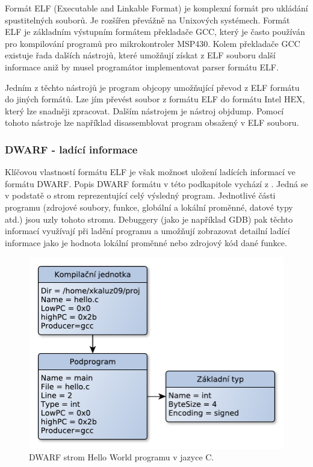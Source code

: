Formát ELF (Executable and Linkable Format) je komplexní formát pro ukládání spustitelných souborů. Je rozšířen převážně na Unixových systémech. Formát ELF je základním výstupním formátem překladače GCC, který je často používán pro kompilování programů pro mikrokontroler MSP430. Kolem překladače GCC existuje řada dalších nástrojů, které umožňují získat z ELF souboru další informace aniž by musel programátor implementovat parser formátu ELF. \cite{elf}

Jedním z těchto nástrojů je program objcopy umožňující převod z ELF formátu do jiných formátů. Lze jím převést soubor z formátu ELF do formátu Intel HEX, který lze snadněji zpracovat. Dalším nástrojem je nástroj objdump. Pomocí tohoto nástroje lze například disassemblovat program obsažený v ELF souboru.

\subsubsection{DWARF - ladící informace}

Klíčovou vlastností formátu ELF je však možnost uložení ladících informací ve formátu DWARF. Popis DWARF formátu v této podkapitole vychází z \cite{dwarf}. Jedná se v podstatě o strom reprezentující celý výsledný
program. Jednotlivé části programu (zdrojové soubory, funkce, globální a lokální proměnné, datové typy atd.) jsou uzly tohoto stromu. Debuggery (jako je například GDB) pak těchto informací využívají při ladění programu a umožňují zobrazovat detailní ladící informace jako je hodnota lokální proměnné nebo zdrojový kód dané funkce.

\begin{figure}[ht]
\centering
\includegraphics[trim=0cm 0cm 0cm 0cm, scale=0.7]{fig/dwarf}
\caption{DWARF strom Hello World programu v jazyce C.}
\label{fig:dwarf}
\end{figure}

